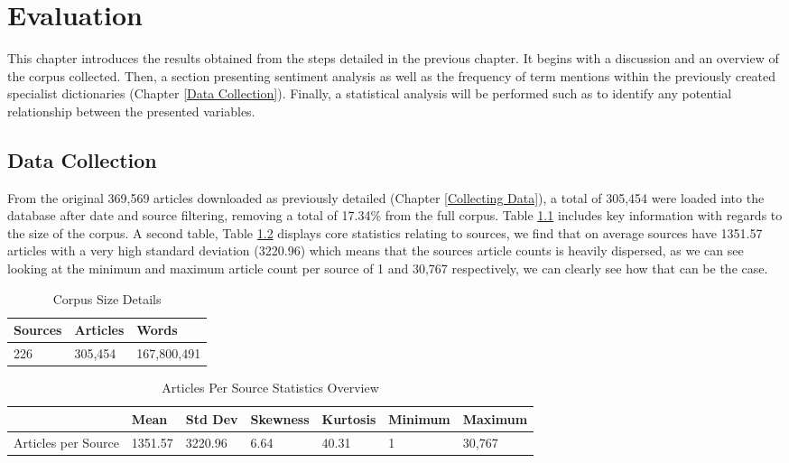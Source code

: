 \chapter{Evaluation}\label{Evalutation}

This chapter introduces the results obtained from the steps detailed in the previous chapter. It begins with a discussion and an overview of the corpus collected. Then, a section presenting sentiment analysis as well as the frequency of term mentions within the previously created specialist dictionaries (Chapter \ref{Data Collection}). Finally, a statistical analysis will be performed such as to identify any potential relationship between the presented variables. 

\section{Data Collection}

From the original 369,569 articles downloaded as previously detailed (Chapter \ref{Collecting Data}), a total of 305,454 were loaded into the database after date and source filtering, removing a total of 17.34\% from the full corpus. Table \ref{tab: corpus size} includes key information with regards to  the size of the corpus. A second table, Table \ref{tab: articles overview} displays core statistics relating to sources, we find that on average sources have 1351.57 articles with a very high standard deviation (3220.96) which means that the sources article counts is heavily dispersed, as we can see looking at the minimum and maximum article count per source of 1 and 30,767 respectively, we can clearly see how that can be the case.

\begin{table}[htb]
\centering
\caption{Corpus Size Details}
\label{tab: corpus size}
\begin{tabular}{lll}
\hline
Sources & Articles & Words \\ \hline
226 & 305,454 & 167,800,491
\end{tabular}
\end{table}

\begin{table}[htb]\label{tab: articles overview}
\centering
\begin{tabular}{@{}lllllll@{}}
\caption{Articles Per Source Statistics Overview}
\toprule
 & Mean & Std Dev & Skewness & Kurtosis & Minimum & Maximum \\ \midrule
Articles per Source & 1351.57 & 3220.96 & 6.64 & 40.31 & 1 & 30,767 \\ \bottomrule
\end{tabular}
\end{table}

